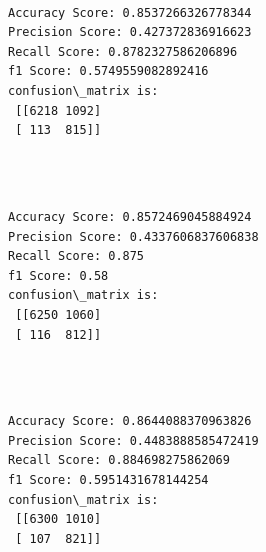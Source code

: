 \documentclass[11pt]{article}
\begin{document}
    \begin{center}
    \end{center}
    { \hspace*{\fill} \\}
    
    \begin{Verbatim}[commandchars=\\\{\}]
Accuracy Score: 0.8537266326778344
Precision Score: 0.427372836916623
Recall Score: 0.8782327586206896
f1 Score: 0.5749559082892416
confusion\_matrix is: 
 [[6218 1092]
 [ 113  815]] 


    \end{Verbatim}

  

    \begin{center}
    \end{center}
    { \hspace*{\fill} \\}
    
    \begin{Verbatim}[commandchars=\\\{\}]
Accuracy Score: 0.8572469045884924
Precision Score: 0.4337606837606838
Recall Score: 0.875
f1 Score: 0.58
confusion\_matrix is: 
 [[6250 1060]
 [ 116  812]] 


    \end{Verbatim}



    \begin{center}
    \end{center}
    { \hspace*{\fill} \\}
    
    \begin{Verbatim}[commandchars=\\\{\}]
Accuracy Score: 0.8644088370963826
Precision Score: 0.4483888585472419
Recall Score: 0.884698275862069
f1 Score: 0.5951431678144254
confusion\_matrix is: 
 [[6300 1010]
 [ 107  821]] 


    \end{Verbatim}

   

    \begin{center}
    \end{center}
    { \hspace*{\fill} \\}
    
\end{document}
